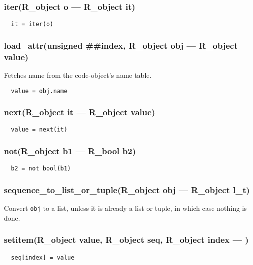 \subsubsection{iter(R\_object o --- R\_object it)}
\vspace{-1em}\begin{verbatim}
  it = iter(o)
\end{verbatim}
\vspace{-1em}\vspace{-1em}
\subsubsection{load\_attr(unsigned \#\#index, R\_object obj --- R\_object value)}
\vspace{-1em}Fetches name from the code-object's name table. \vspace{-1em}\begin{verbatim}
  value = obj.name
\end{verbatim}
\vspace{-1em}\vspace{-1em}
\subsubsection{next(R\_object it --- R\_object value) }
\vspace{-1em}\begin{verbatim}
  value = next(it)
\end{verbatim}
\vspace{-1em}\vspace{-1em}
\subsubsection{not(R\_object b1 --- R\_bool b2)}
\vspace{-1em}\begin{verbatim}
  b2 = not bool(b1)
\end{verbatim}
\vspace{-1em}\vspace{-1em}
\subsubsection{sequence\_to\_list\_or\_tuple(R\_object obj --- R\_object l\_t)}
\vspace{-1em}Convert \texttt{obj} to a list, unless it is already a list or tuple, in which case nothing is done. \vspace{-1em}
\subsubsection{setitem(R\_object value, R\_object seq, R\_object index --- )}
\vspace{-1em}\begin{verbatim}
  seq[index] = value
\end{verbatim}
\vspace{-1em}\vspace{-1em}
